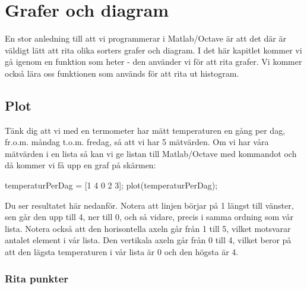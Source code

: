 %
%
\chapter{Grafer och diagram}\label{ch:grafer}
En stor anledning till att vi programmerar i Matlab/Octave är att det där är väldigt lätt att rita olika sorters grafer och diagram. I det här kapitlet kommer vi gå igenom en funktion som heter  - den använder vi för att rita grafer. Vi kommer också lära oss funktionen  som används för att rita ut histogram.


\section{Plot}

Tänk dig att vi med en termometer har mätt temperaturen en gång per dag, fr.o.m. måndag t.o.m. fredag, så att vi har 5 mätvärden. Om vi har våra mätvärden i en lista så kan vi ge listan till Matlab/Octave med kommandot  och då kommer vi få upp en graf på skärmen:

\begin{matlab}[caption={Vår första graf},label={}]
temperaturPerDag = [1 4 0 2 3];
plot(temperaturPerDag);
\end{matlab}

Du ser resultatet här nedanför. Notera att linjen börjar på 1 längst till vänster, sen går den upp till 4, ner till 0, och så vidare, precis i samma ordning som vår lista. Notera också att den horisontella axeln går från 1 till 5, vilket motsvarar antalet element i vår lista. Den vertikala axeln går från 0 till 4, vilket beror på att den lägsta temperaturen i vår lista är 0 och den högsta är 4.
\newpage
{}

\subsection{Rita punkter}


